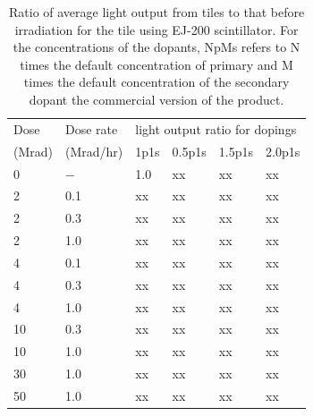 \documentclass[review]{elsarticle}
\begin{document}
\begin{table}[thb]
\centering
\caption{
Ratio of average light output from tiles to that before irradiation
for the tile using EJ-200 scintillator.  For the concentrations
of the dopants, NpMs refers to N times the default concentration of primary and M times the default concentration of the secondary dopant
the commercial version of the product.
}
\label{tab:ResultsEJ200}
{\small
\begin{tabular}{|l| l| l| l| l| l|}
\hline
Dose & Dose rate  &\multicolumn{4}{|l|}{light output ratio for dopings} \\
(Mrad)  & (Mrad/hr) & 1p1s & 0.5p1s & 1.5p1s & 2.0p1s   \\
\hline
\hline
0 & $-$ & 1.0 & {\color{red} xx} & {\color{red} xx} & {\color{red} xx}\\ \hline
2 & 0.1 & {\color{red} xx} & {\color{red} xx} & {\color{red} xx} & {\color{red} xx}\\
2 & 0.3 & {\color{red} xx} & {\color{red} xx} & {\color{red} xx} & {\color{red} xx}\\
2 & 1.0 & {\color{red} xx} & {\color{red} xx} & {\color{red} xx} & {\color{red} xx}\\ \hline
4 & 0.1 & {\color{red} xx} & {\color{red} xx} & {\color{red} xx} & {\color{red} xx}\\
4 & 0.3 & {\color{red} xx} & {\color{red} xx} & {\color{red} xx} & {\color{red} xx}\\
4 & 1.0 & {\color{red} xx} & {\color{red} xx} & {\color{red} xx} & {\color{red} xx}\\ \hline
10 & 0.3 & {\color{red} xx} & {\color{red} xx} & {\color{red} xx} & {\color{red} xx}\\
10 & 1.0 & {\color{red} xx} & {\color{red} xx} & {\color{red} xx} & {\color{red} xx}\\ \hline
30 & 1.0 & {\color{red} xx} & {\color{red} xx} & {\color{red} xx} & {\color{red} xx}\\ \hline
50 & 1.0 & {\color{red} xx} & {\color{red} xx} & {\color{red} xx} & {\color{red} xx}\\ \hline
\hline
\end{tabular}
}
\end{table}
\end{document}

